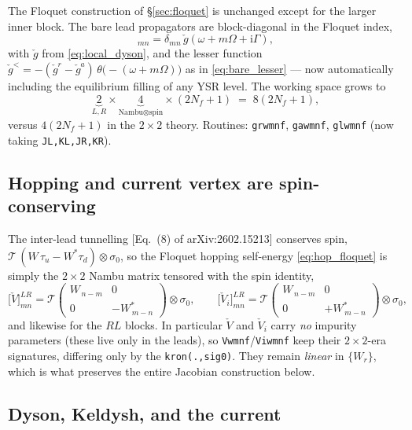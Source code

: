 \documentclass[11pt,a4paper]{article}
\newcommand{\ii}{\mathrm{i}}
\newcommand{\Om}{\Omega}
\newcommand{\Wm}{W}
\begin{document}
The Floquet construction of \S\ref{sec:floquet} is unchanged except for the
larger inner block.  The bare lead propagators are block-diagonal in the Floquet
index,
\begin{equation}
  [\check g^r]_{mn}=\delta_{mn}\,\check g(\omega+m\Om+\ii\Gamma),
\end{equation}
with $\check g$ from \eqref{eq:local_dyson}, and the lesser function
$\check g^<=-(\check g^r-\check g^a)\,\theta\!\big(-(\omega+m\Om)\big)$ as in
\eqref{eq:bare_lesser} --- now automatically including the equilibrium filling of
any YSR level.  The working space grows to
\begin{equation}
  \underbrace{2}_{L,R}\times\underbrace{4}_{\text{Nambu}\otimes\text{spin}}\times(2N_f+1)
  \;=\;8(2N_f+1),
\end{equation}
versus $4(2N_f+1)$ in the $2\times2$ theory.  Routines: \texttt{grwmnf},
\texttt{gawmnf}, \texttt{glwmnf} (now taking \texttt{JL,KL,JR,KR}).

\subsection{Hopping and current vertex are spin-conserving}
\label{sec:ysr_hop}

The inter-lead tunnelling [Eq.~(8) of arXiv:2602.15213] conserves spin,
$\mathcal T\,(W\,\tau_u-W^{*}\tau_d)\otimes\sigma_0$, so the Floquet hopping
self-energy \eqref{eq:hop_floquet} is simply the $2\times2$ Nambu matrix tensored
with the spin identity,
\begin{equation}
  \big[\check V\big]^{LR}_{mn}
  =\mathcal T\begin{pmatrix}\Wm_{\,n-m}&0\\0&-\Wm^{*}_{\,m-n}\end{pmatrix}\!\otimes\sigma_0,
  \qquad
  \big[\check V_i\big]^{LR}_{mn}
  =\mathcal T\begin{pmatrix}\Wm_{\,n-m}&0\\0&+\Wm^{*}_{\,m-n}\end{pmatrix}\!\otimes\sigma_0,
  \label{eq:hop_4x4}
\end{equation}
and likewise for the $RL$ blocks.  In particular $\check V$ and $\check V_i$ carry
\emph{no} impurity parameters (these live only in the leads), so
\texttt{Vwmnf}/\texttt{Viwmnf} keep their $2\times2$-era signatures, differing
only by the \verb|kron(.,sig0)|.  They remain \emph{linear} in $\{\Wm_r\}$, which
is what preserves the entire Jacobian construction below.

\subsection{Dyson, Keldysh, and the current}
\label{sec:ysr_current}
\end{document}
